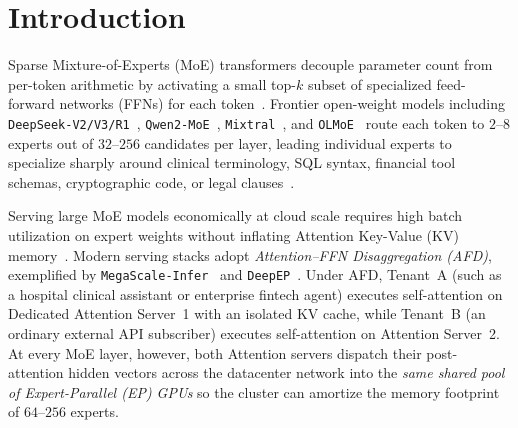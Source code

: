 \documentclass[10pt,journal,compsoc]{IEEEtran}
\theoremstyle{definition}
\theoremstyle{remark}
\begin{document}
\maketitle
\IEEEdisplaynontitleabstractindextext
\IEEEpeerreviewmaketitle

\section{Introduction}\label{sec:intro}

Sparse Mixture-of-Experts (MoE) transformers decouple parameter count from per-token arithmetic by activating a small top-$k$ subset of specialized feed-forward networks (FFNs) for each token~\cite{shazeer2017outrageously,fedus2022switch}. Frontier open-weight models including \texttt{DeepSeek-V2/V3/R1}~\cite{deepseek2024v2,deepseek2025v3,deepseek2025r1}, \texttt{Qwen2-MoE}~\cite{yang2024qwen2moe}, \texttt{Mixtral}~\cite{jiang2024mixtral}, and \texttt{OLMoE}~\cite{muennighoff2025olmoe} route each token to $2$--$8$ experts out of $32$--$256$ candidates per layer, leading individual experts to specialize sharply around clinical terminology, SQL syntax, financial tool schemas, cryptographic code, or legal clauses~\cite{dai2024deepseekmoe}.

Serving large MoE models economically at cloud scale requires high batch utilization on expert weights without inflating Attention Key-Value (KV) memory~\cite{kwon2023vllm,zheng2024sglang,zhong2024distserve,patel2024splitwise}. Modern serving stacks adopt \emph{Attention--FFN Disaggregation (AFD)}, exemplified by \texttt{MegaScale-Infer}~\cite{zhu2025megascaleinfer} and \texttt{DeepEP}~\cite{zhao2025deepep}. Under AFD, Tenant~A (such as a hospital clinical assistant or enterprise fintech agent) executes self-attention on Dedicated Attention Server~1 with an isolated KV cache, while Tenant~B (an ordinary external API subscriber) executes self-attention on Attention Server~2. At every MoE layer, however, both Attention servers dispatch their post-attention hidden vectors across the datacenter network into the \emph{same shared pool of Expert-Parallel (EP) GPUs} so the cluster can amortize the memory footprint of $64$--$256$ experts.
\end{document}
